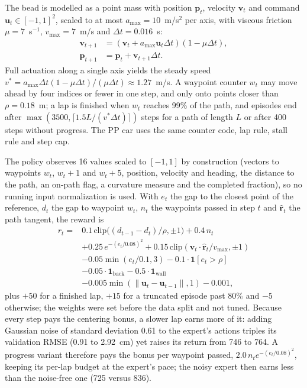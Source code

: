 \documentclass[10pt,twocolumn,twoside]{article}
\newcommand{\amax}{a_{\max}}
\newcommand{\vmax}{v_{\max}}
\newcommand{\one}{\mathbf{1}}
\begin{document}
The bead is modelled as a point mass with position $\mathbf{p}_t$, velocity $\mathbf{v}_t$
and command $\mathbf{u}_t\in[-1,1]^2$, scaled to at most $\amax=10$~m/s$^2$ per
axis, with viscous friction $\mu=7$~s$^{-1}$, $\vmax=7$~m/s and
$\Delta t=0.016$~s:
\begin{equation}
\begin{aligned}
\mathbf{v}_{t+1} &= (\mathbf{v}_t+\amax\mathbf{u}_t\Delta t)(1-\mu\Delta t),\\
\mathbf{p}_{t+1} &= \mathbf{p}_t+\mathbf{v}_{t+1}\Delta t.
\end{aligned}
\label{eq:bead}
\end{equation}
Full actuation along a single axis yields the steady speed
$v^{*}=\amax\Delta t(1-\mu\Delta t)/(\mu\Delta t)\approx1.27$~m/s. A waypoint
counter $w_t$ may move ahead by four indices or fewer in one step, and only onto
points closer than $\rho=0.18$~m; a lap is finished when $w_t$ reaches 99\% of
the path, and episodes end after
$\max(3500,\lceil1.5L/(v^{*}\Delta t)\rceil)$ steps for a path of length $L$ or
after 400 steps without progress. The PP car uses the same counter code, lap
rule, stall rule and step cap.

The policy observes 16 values scaled to $[-1,1]$ by construction (vectors to
waypoints $w_t$, $w_t+1$ and $w_t+5$, position, velocity and heading, the
distance to the path, an on-path flag, a curvature measure and the completed
fraction), so no running input normalization is used. With $e_t$ the gap
to the closest point of the reference, $d_t$ the gap to waypoint $w_t$, $n_t$ the
waypoints passed in step $t$ and $\hat{\mathbf{r}}_t$ the path tangent, the
reward is
\begin{equation}
\begin{aligned}
r_t ={}& 0.1\,\mathrm{clip}\big((d_{t-1}-d_t)/\rho,\pm1\big)+0.4\,n_t\\
 &+0.25\,e^{-(e_t/0.08)^2}+0.15\,\mathrm{clip}(\mathbf{v}_t\cdot\hat{\mathbf{r}}_t/\vmax,\pm1)\\
 &-0.05\min(e_t/0.1,3)-0.1\cdot\one[e_t>\rho]\\
 &-0.05\cdot\one_{\mathrm{back}}-0.5\cdot\one_{\mathrm{wall}}\\
 &-0.005\min(\|\mathbf{u}_t-\mathbf{u}_{t-1}\|,1)-0.001,
\end{aligned}
\label{eq:reward}
\end{equation}
plus $+50$ for a finished lap, $+15$ for a truncated episode past 80\% and $-5$
otherwise; the weights were set before the data split and not tuned. Because
every step pays the centering bonus, a slower lap earns more of it:
adding Gaussian noise of standard deviation 0.61 to the expert's actions triples
its validation RMSE (0.91 to 2.92~cm) yet raises its return from 746 to 764. A
progress variant therefore pays the bonus per waypoint passed,
$2.0\,n_te^{-(e_t/0.08)^2}$, keeping its per-lap budget at the expert's pace;
the noisy expert then earns less than the noise-free one (725 versus 836).
\end{document}

